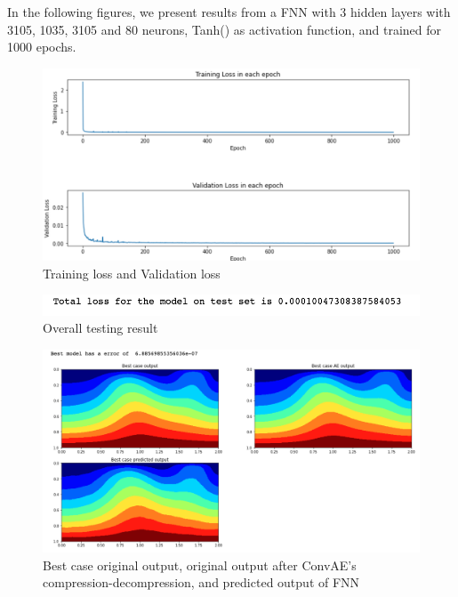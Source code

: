 In the following figures, we present results from a FNN with 3 hidden layers with 3105, 1035, 3105 and 80 neurons, Tanh() as activation function, and trained for 1000 epochs.

\begin{figure}[H]
    \caption{Training loss and Validation loss}
    \includegraphics[scale=0.6]{Report LaTeX/figures/mantle_convection_images/limited_dataset/FNN_trainingData.png}
\end{figure}

\begin{figure}[H]
    \caption{Overall testing result}
    \includegraphics[scale=0.8]{Report LaTeX/figures/mantle_convection_images/limited_dataset/FNN_OverallTesting.png}
\end{figure}

\begin{figure}[H]
    \caption{Best case original output, original output after ConvAE's compression-decompression, and predicted output of FNN}
    \includegraphics[scale=0.5]{Report LaTeX/figures/mantle_convection_images/limited_dataset/FNN_Best.png}
\end{figure}

